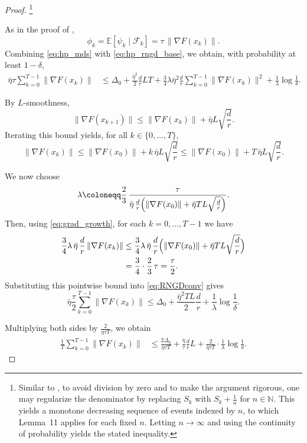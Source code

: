 \documentclass[10pt]{article}
\begin{document}
\begin{proof}
\footnote{
Similar to ,
to avoid division by zero and to make the argument rigorous,
one may regularize the denominator by replacing
$S_k$ with $S_k + \tfrac{1}{n}$ for $n\in\mathbb{N}$.
This yields a monotone decreasing sequence of events indexed by $n$,
to which Lemma~11 applies for each fixed $n$.
Letting $n\to\infty$ and using the continuity of probability
yields the stated inequality.
}

As in the proof of ,
\[
\phi_k
=
\mathbb{E}[\psi_k \mid \mathcal{F}_k]
=
\tau\,\|\nabla F(x_k)\|.
\]
Combining \eqref{eq:hp_mds} with \eqref{eq:hp_rngd_base},
we obtain, with probability at least $1-\delta$,
\begin{align}\label{eq:RNGDconv}
\bar{\eta}\tau\sum_{k=0}^{T-1}\|\nabla F(x_k)\|
&\le
\Delta_0
+
\frac{\bar{\eta}^2}{2}\frac{d}{r}LT
+
\frac{3}{4}\lambda\bar{\eta}^2\frac{d}{r}
\sum_{k=0}^{T-1}\|\nabla F(x_k)\|^2
+
\frac{1}{\lambda}\log\frac{1}{\delta}.
\end{align}

By $L$-smoothness, 
\[
\|\nabla F(x_{k+1})\|
\le
\|\nabla F(x_k)\|+\bar{\eta} L\sqrt{\frac{d}{r}}.
\]
Iterating this bound yields, for all $k\in\{0,\dots,T\}$,
\begin{equation}
\|\nabla F(x_k)\|
\le
\|\nabla F(x_0)\|
+
k\,\bar{\eta}  L\sqrt{\frac{d}{r}}
\le
\|\nabla F(x_0)\|
+
T\,\bar{\eta}  L\sqrt{\frac{d}{r}}.
\label{eq:grad_growth}
\end{equation}

We now choose
\[
\lambda
\coloneqq
\frac{2}{3}\,
\frac{\tau}{
\bar{\eta} \,\frac{d}{r}\Bigl(\|\nabla F(x_0)\|+\bar{\eta}  T L\sqrt{\frac{d}{r}}\Bigr)
}.
\]
Then, using \eqref{eq:grad_growth}, for each $k=0,\dots,T-1$ we have
\begin{align*}
\frac{3}{4}\lambda\,\bar{\eta} \,\frac{d}{r}\,\|\nabla F(x_k)\|
&\le
\frac{3}{4}\lambda\,\bar{\eta} \,\frac{d}{r}\Bigl(\|\nabla F(x_0)\|+\bar{\eta}  T L\sqrt{\frac{d}{r}}\Bigr) \\
&=
\frac{3}{4}\cdot
\frac{2}{3}\,\tau
=
\frac{\tau}{2}.
\end{align*}
Substituting this pointwise bound into \eqref{eq:RNGDconv} gives
\[
\bar{\eta} \frac{\tau}{2}\sum_{k=0}^{T-1}\|\nabla F(x_k)\|
\le
\Delta_0
+\frac{\bar{\eta} ^2TL}{2}\frac{d}{r}
+\frac{1}{\lambda}\log\frac{1}{\delta}.
\]

Multiplying both sides by $\frac{2}{\bar{\eta}\tau T}$, we obtain
\begin{align*}
\frac{1}{T}\sum_{k=0}^{T-1}\|\nabla F(x_k)\|
&\le
\frac{2\Delta_0}{\bar{\eta}\tau T}
+
\frac{\bar{\eta}}{\tau}\frac{d}{r}L
+
\frac{2}{\bar{\eta}\tau T}\cdot\frac{1}{\lambda}\log\frac{1}{\delta}.
\end{align*}


\end{proof}
\end{document}
